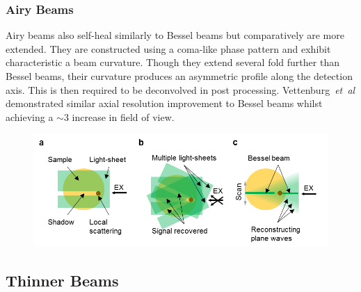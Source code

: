\subsubsection{Airy Beams}
Airy beams also self-heal similarly to Bessel beams but comparatively are more extended.
They are constructed using a coma-like phase pattern and exhibit characteristic a beam curvature.
Though they extend several fold further than Bessel beams, their curvature produces an asymmetric profile along the detection axis.
This is then required to be deconvolved in post processing.
Vettenburg~\emph{et~al}\cite{vettenburg_light-sheet_2014} demonstrated similar axial resolution improvement to Bessel beams whilst achieving a $\sim 3$ increase in field of view.

\begin{figure}
	\centering
	\label{fig:scatteringandshadowing}
	\includegraphics[width=\textwidth]{scatteringinlsfm}
\end{figure}
\subsection{Thinner Beams}

